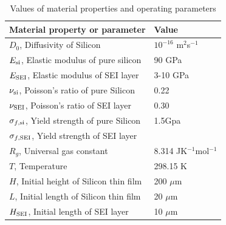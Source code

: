 \begin{table}[H]
\caption{Values of material properties and operating parameters}
\vspace{1em}
\begin{tabularx}{\textwidth}{Xl}
\hline
  {Material property or parameter} & {Value} \\
\hline
$D_0$, Diffusivity of Silicon & $10^{-16}$ m$^{2}$s$^{-1}$ \\
$E_{{\rm{si}}}$, Elastic modulus of pure silicon & 90 GPa \\
$E_{\rm{SEI}}$, Elastic modulus of SEI layer & 3-10 GPa \\
$\nu_{{\rm{si}}}$, Poisson's ratio of pure Silicon & 0.22\\
$\nu_{\rm{SEI}}$, Poisson's ratio of SEI layer & 0.30\\
$\sigma_{f,{\rm{si}}}$, Yield strength of pure Silicon & 1.5Gpa\\
$\sigma_{f, {\rm{SEI}}}$, Yield strength of SEI layer & \\
$R_g$, Universal gas constant & 8.314 JK$^{-1}$mol$^{-1}$\\
$T$, Temperature & 298.15 K\\
$H$, Initial height of Silicon thin film & 200 $\mu$m\\
$L$, Initial length of Silicon thin film & 20 $\mu$m\\
$H_{\rm{SEI}}$, Initial length of SEI layer & 10 $\mu$m
\end{tabularx}
\end{table}



